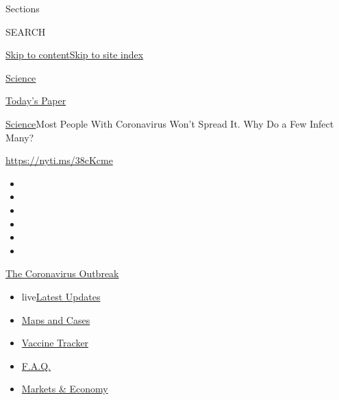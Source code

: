 Sections

SEARCH

\protect\hyperlink{site-content}{Skip to
content}\protect\hyperlink{site-index}{Skip to site index}

\href{https://www.nytimes.com/section/science}{Science}

\href{https://myaccount.nytimes.com/auth/login?response_type=cookie\&client_id=vi}{}

\href{https://www.nytimes.com/section/todayspaper}{Today's Paper}

\href{/section/science}{Science}\textbar{}Most People With Coronavirus
Won't Spread It. Why Do a Few Infect Many?

\href{https://nyti.ms/38cKcme}{https://nyti.ms/38cKcme}

\begin{itemize}
\item
\item
\item
\item
\item
\item
\end{itemize}

\href{https://www.nytimes.com/news-event/coronavirus?action=click\&pgtype=Article\&state=default\&region=TOP_BANNER\&context=storylines_menu}{The
Coronavirus Outbreak}

\begin{itemize}
\tightlist
\item
  live\href{https://www.nytimes.com/2020/08/08/world/coronavirus-updates.html?action=click\&pgtype=Article\&state=default\&region=TOP_BANNER\&context=storylines_menu}{Latest
  Updates}
\item
  \href{https://www.nytimes.com/interactive/2020/us/coronavirus-us-cases.html?action=click\&pgtype=Article\&state=default\&region=TOP_BANNER\&context=storylines_menu}{Maps
  and Cases}
\item
  \href{https://www.nytimes.com/interactive/2020/science/coronavirus-vaccine-tracker.html?action=click\&pgtype=Article\&state=default\&region=TOP_BANNER\&context=storylines_menu}{Vaccine
  Tracker}
\item
  \href{https://www.nytimes.com/interactive/2020/world/coronavirus-tips-advice.html?action=click\&pgtype=Article\&state=default\&region=TOP_BANNER\&context=storylines_menu}{F.A.Q.}
\item
  \href{https://www.nytimes.com/live/2020/08/07/business/stock-market-today-coronavirus?action=click\&pgtype=Article\&state=default\&region=TOP_BANNER\&context=storylines_menu}{Markets
  \& Economy}
\end{itemize}

